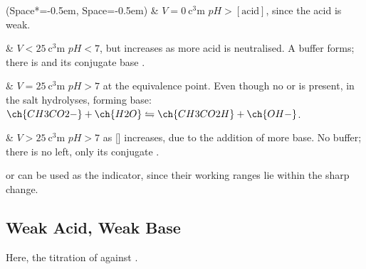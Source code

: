 			\begin{bulletlist}
				\ListProperties(Space*=-0.5em, Space=-0.5em)
				& $V = \SI{0}{\cubic\centi\metre}$
					\tabto{25mm}$pH > [\mathrm{acid}]$, since the acid is weak.

				& $V < \SI{25}{\cubic\centi\metre}$
					\tabto{25mm}$pH < 7$, but increases as more acid is neutralised.
					\tabto{25mm}A buffer forms; there is  and its conjugate base .

				& $V = \SI{25}{\cubic\centi\metre}$
					\tabto{25mm}$pH > 7$ at the equivalence point.
					\tabto{25mm}Even though no  or  is present,  in the salt hydrolyses,
					\tabto{25mm}forming base: $\ch{CH3CO2-} + \ch{H2O} \leftrightharpoons \ch{CH3CO2H} + \ch{OH-}$.

				& $V > \SI{25}{\cubic\centi\metre}$
					\tabto{25mm}$pH > 7$ as [] increases, due to the addition of more base.
					\tabto{25mm}No buffer; there is no  left, only its conjugate .


			\end{bulletlist}

			 or  can be used as the indicator, since their working ranges lie within the sharp
			\pH{} change.























		\pagebreak
		\subsection{Weak Acid, Weak Base}

			Here, the titration of  against .

